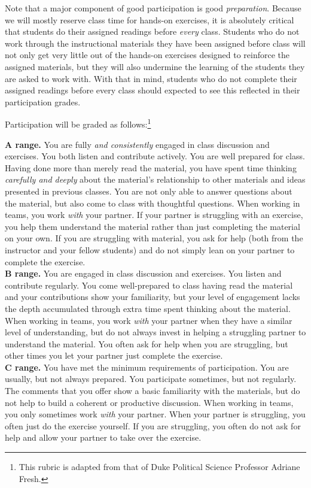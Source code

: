 \documentclass[12pt]{article}
\begin{document}
Note that a major component of good participation is good \emph{preparation}. Because we will mostly reserve class time for hands-on exercises, it is absolutely critical that students do their assigned readings before \emph{every} class. Students who do not work through the instructional materials they have been assigned before class will not only get very little out of the hands-on exercises designed to reinforce the assigned materials, but they will also undermine the learning of the students they are asked to work with. With that in mind, students who do not complete their assigned readings before every class should expected to see this reflected in their participation grades.

Participation will be graded as follows:\footnote{This rubric is adapted from that of Duke Political Science Professor Adriane Fresh.}

\textbf{A range.}  You are fully \emph{and consistently} engaged in class discussion and exercises.  You both listen and contribute actively.  You are well prepared for class.  Having done more than merely read the material, you have spent time thinking \emph{carefully and deeply} about the material's relationship to other materials and ideas presented in previous classes. You are not only able to answer questions about the material, but also come to class with thoughtful questions.  When working in teams, you work \emph{with} your partner. If your partner is struggling with an exercise, you help them understand the material rather than just completing the material on your own. If you are struggling with material, you ask for help (both from the instructor and your fellow students) and do not simply lean on your partner to complete the exercise. \\

\textbf{B range.}  You are engaged in class discussion and exercises.  You listen and contribute regularly.  You come well-prepared to class having read the material and your contributions show your familiarity, but your level of engagement lacks the depth accumulated through extra time spent thinking about the material.  When working in teams, you work \emph{with} your partner when they have a similar level of understanding, but do not always invest in helping a struggling partner to understand the material. You often ask for help when you are struggling, but other times you let your partner just complete the exercise. \\

\textbf{C range.}  You have met the minimum requirements of participation.  You are usually, but not always prepared.  You participate sometimes, but not regularly.  The comments that you offer show a basic familiarity with the materials, but do not help to build a coherent or productive discussion.  When working in teams, you only sometimes work \emph{with} your partner. When your partner is struggling, you often just do the exercise yourself. If you are struggling, you often do not ask for help and allow your partner to take over the exercise. \\
\end{document}
